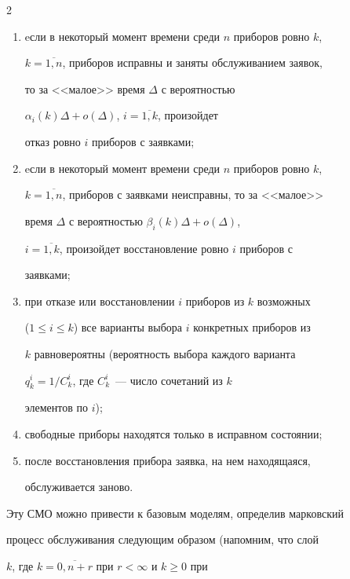 \begin{multicols}{2}
\begin{enumerate}[(1)]


\item  eсли в некоторый момент времени среди $n$ приборов ровно $k$,


$k=\overline{1,n}$, приборов исправны и заняты обслуживанием заявок,


то за <<малое>> время $\Delta$ с вероятностью


$\alpha_i(k)\Delta+o(\Delta)$, $i=\overline{1,k}$, произойдет


отказ ровно $i$ приборов с заявками;


\item


eсли в некоторый момент времени среди $n$ приборов ровно $k$,


$k=\overline{1,n}$, приборов с заявками неисправны, то за <<малое>>


время $\Delta$ с вероятностью $\beta_i(k)\Delta+o(\Delta)$,


$i=\overline{1,k}$, произойдет восстановление ровно $i$ приборов с


заявками;


\item


 при отказе или восстановлении $i$ приборов из $k$ возможных


($1\le i\le k$) все варианты выбора $i$ конкретных приборов из


$k$ равновероятны (вероятность выбора каждого варианта


$q^{i}_{k}=1/C^i_k$, где $C^i_k$~--- число сочетаний из $k$


элементов по $i$);


\item


свободные приборы находятся только в исправном состоянии;


\item


после восстановления прибора заявка, на нем находящаяся,


обслуживается заново.


\end{enumerate}





Эту СМО можно привести к базовым моделям, определив марковский


процесс обслуживания следующим образом (напомним, что слой


$k$, где $k=\overline{0,n+r}$ при $r<\infty$ и $k\ge 0$ при



\end{multicols}
